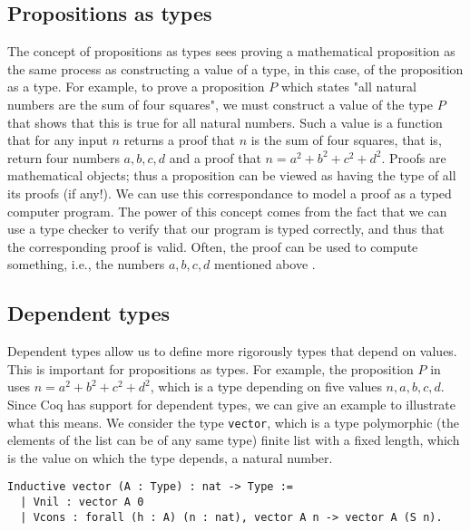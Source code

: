 \subsection{Propositions as types}
\label{ssec:propositions_as_types}

The concept of propositions as types sees proving a mathematical proposition
as the same process as constructing a value of a type, in this case,
of the proposition as a type.
For example, to prove a proposition $P$ which states "all natural numbers are the sum of four squares",
we must construct a value of the type $P$ that shows that this is true for all natural numbers.
Such a value is a function that for any input $n$ returns a proof that $n$ is the sum of four squares,
that is, return four numbers $a, b, c, d$ and a proof that $n = a^2 + b^2 + c^2 + d^2$.
Proofs are mathematical objects; thus a proposition can be viewed as having the type of all its proofs (if any!).
We can use this correspondance to model a proof as a typed computer program.
The power of this concept comes from the fact that we can use a type checker to verify that
our program is typed correctly, and thus that the corresponding proof is valid.
Often, the proof can be used to compute something, i.e., the numbers $a, b, c, d$ mentioned above
\cite{pwadler}.

\subsection{Dependent types}
\label{ssec:dependent_types}

Dependent types allow us to define more rigorously types that depend on values.
This is important for propositions as types.
For example, the proposition $P$ in  uses
$n = a^2 + b^2 + c^2 + d^2$, which is a type depending on five values $n, a, b, c, d$.
Since Coq has support for dependent types, we can give an example to illustrate what this means.
We consider the type \lstinline{vector}, which is a type polymorphic (the elements of the list can be of any same type)
finite list with a fixed length, which is the value on which the type depends, a natural number.

\begin{minipage}{\linewidth}
\begin{lstlisting}[language=Coq, label={lst:dep_type_vec}, caption={\lstinline{vector} in Coq, using dependent types}]
Inductive vector (A : Type) : nat -> Type :=
  | Vnil : vector A 0
  | Vcons : forall (h : A) (n : nat), vector A n -> vector A (S n).
\end{lstlisting}
\end{minipage}


